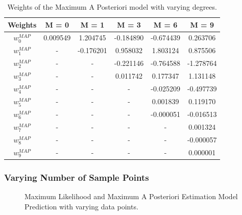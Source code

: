 \documentclass[12pt,twoside,a4paper]{article}
\begin{document}
\begin{table}[H]
\centering
\begin{tabular}{|c|c|c|c|c|c|}
\hline
\textbf{Weights}              & \textbf{M = 0} & \textbf{M = 1} & \textbf{M = 3} & \textbf{M = 6} & \textbf{M = 9} \\ \hline
\textit{\textbf{$w_0^{MAP}$}} & 0.009549       & 1.204745       & -0.184890      & -0.674439      & 0.263706       \\ \hline
\textit{\textbf{$w_1^{MAP}$}} & -              & -0.176201      & 0.958032       & 1.803124       & 0.875506       \\ \hline
\textit{\textbf{$w_2^{MAP}$}} & - & - & -0.221146 & -0.764588 & -1.278764 \\ \hline
\textit{\textbf{$w_3^{MAP}$}} & - & - & 0.011742  & 0.177347  & 1.131148  \\ \hline
\textit{\textbf{$w_4^{MAP}$}} & - & - & -         & -0.025209 & -0.497739 \\ \hline
\textit{\textbf{$w_5^{MAP}$}} & - & - & -         & 0.001839  & 0.119170  \\ \hline
\textit{\textbf{$w_6^{MAP}$}} & - & - & -         & -0.000051 & -0.016513 \\ \hline
\textit{\textbf{$w_7^{MAP}$}} & - & - & -         & -         & 0.001324  \\ \hline
\textit{\textbf{$w_8^{MAP}$}} & - & - & -         & -         & -0.000057 \\ \hline
\textit{\textbf{$w_9^{MAP}$}} & - & - & -         & -         & 0.000001  \\ \hline
\end{tabular}
\caption{Weights of the Maximum A Posteriori model with varying degrees.}
\label{MAPWEIGHTS}
\end{table}


\pagebreak
\subsubsection{Varying Number of Sample Points}

\begin{figure}[H]
    \centering
    \hspace{0mm}
    \hspace{0mm}
    \caption{Maximum Likelihood and Maximum A Posteriori Estimation Model Prediction with varying data points.}
\end{figure}
\end{document}
